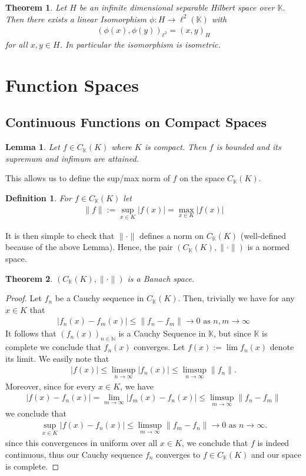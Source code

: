 \documentclass[11pt,a4paper]{article}
\newtheorem{lem}{Lemma}[section]
\newtheorem{thm}{Theorem}[section]
\newtheorem{defn}{Definition}[section]
\theoremstyle{definition}
\begin{document}
\begin{thm} Let $H$ be an infinite dimensional separable Hilbert space over $\mathbb{K}$. Then there exists a linear Isomorphism $\phi: H \to \ell^2( \mathbb{K})$ with 
\begin{align*}
( \phi(x), \phi(y))_{ \ell^2} =(x,y)_H
\end{align*}
for all $x,y \in H$. In particular the isomorphism is isometric. 
\end{thm}
\newpage
\section{Function Spaces}
\subsection{Continuous Functions on Compact Spaces}
\begin{lem} Let $f \in C_\mathbb{K}(K)$ where $K$ is compact. Then $f$ is bounded and its supremum and infimum are attained. 
\end{lem}
\noindent This allows us to define the sup/max norm of $f$ on the space $C_\mathbb{K}(K)$.
\begin{defn} For $f \in C_\mathbb{K}(K)$ let 
\begin{align*}
\|f\|:= \sup_{x \in K} | f(x)| = \max_{x \in K} | f(x)|
\end{align*}
\end{defn}
\noindent It is then simple to check that $\| \cdot \|$ defines a norm on $C_\mathbb{K}(K)$ (well-defined because of the above Lemma). Hence, the pair $(C_\mathbb{K}(K), \| \cdot \|)$ is a normed space. 
\begin{thm} $(C_\mathbb{K}(K), \| \cdot \|)$ is a Banach space. 
\end{thm}
\begin{proof}
Let $f_n$ be a Cauchy sequence in $C_\mathbb{K}(K)$. Then, trivially we have for any $x \in K$ that 
\begin{align*}
|f_n(x) - f_m(x)| \leq \|f_n -f_m \| \to 0 \text{ as } n,m \to \infty
\end{align*}
It follows that $(f_n(x))_{n \in \mathbb{N}}$ is a Cauchy Sequence in $\mathbb{K}$, but since $\mathbb{K}$ is complete we conclude that $f_n(x)$ converges. Let $f(x):= \lim f_n(x)$ denote its limit. We easily note that
\begin{align*}
|f(x)| \leq \limsup_{n \to \infty} |f_n(x)| \leq \limsup_{n \to \infty} \|f_n\|.
\end{align*}
Moreover, since for every $x \in K$, we have 
\begin{align*}
|f(x)-f_n(x)| = \lim_{m \to \infty} | f_m(x)-f_n(x)| \leq \limsup_{m \to \infty} \| f_n-f_m\|
\end{align*}
we conclude that
\begin{align*}
\sup_{x \in K} |f(x)-f_n(x)| \leq \limsup_{m \to \infty} \|f_m-f_n\| \to 0 \text{ as } n \to \infty.
\end{align*}
since this convergences in uniform over all $x \in K$, we conclude that $f$ is indeed continuous, thus our Cauchy sequence $f_n$ converges to $f \in C_\mathbb{K}(K)$ and our space is complete. 
\end{proof}
\end{document}
